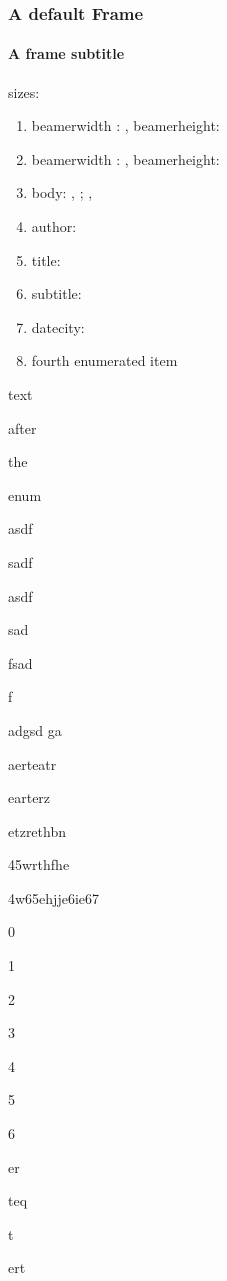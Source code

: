 \documentclass[german,aspectratio=169,notoc,titlestyle=tud,draft]{tudbeamer}%
\begin{document}
\begin{frame}[allowframebreaks]
	\frametitle{A default Frame}
	\framesubtitle{A frame subtitle}
	sizes:
	\begin{enumerate}
		\item beamerwidth : \the\paperwidth, beamerheight: \the\paperheight
		\item beamerwidth : \number\paperwidth, beamerheight:\number\paperheight
		\item body: \the\bodyx, \the\bodyy; \the\bodywidth, \the\bodywidth
		\item author: \insertauthor
		\item title: \inserttitle
		\item subtitle: \insertsubtitle
		\item datecity: \insertdatecity
		\item fourth enumerated item
	\end{enumerate}
	text 

	after 

	the 

	enum

	asdf

	sadf
	
	asdf
	
	sad
	
	fsad
	
	f

	adgsd
	ga

	aerteatr

	earterz

	etzrethbn

	45wrthfhe

	4w65ehjje6ie67

	0
	
	1

	2
	
	3

	4

	5

	6

	er
	
	teq
	
	t

	ert
\end{frame}
\end{document}
